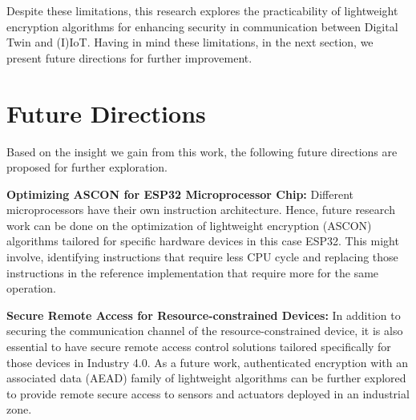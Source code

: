 Despite these limitations, this research explores the practicability of lightweight encryption algorithms for enhancing security in communication between Digital Twin and (I)IoT. Having in mind these limitations, in the next section, we present future directions for further improvement. 


\section{Future Directions}
Based on the insight we gain from this work, the following future directions are proposed for further exploration. 

\textbf{Optimizing ASCON for ESP32 Microprocessor Chip:}
Different microprocessors have their own instruction architecture. Hence, future research work can be done on the optimization of lightweight encryption (ASCON) algorithms tailored for specific hardware devices in this case ESP32. This might involve, identifying instructions that require less CPU cycle and replacing those instructions in the reference implementation that require more for the same operation. 

\textbf{Secure Remote Access for Resource-constrained Devices:} In addition to securing the communication channel of the resource-constrained device, it is also essential to have secure remote access control solutions tailored specifically for those devices in Industry 4.0. As a future work, authenticated encryption with an associated data (AEAD) family of lightweight algorithms can be further explored to provide remote secure access to sensors and actuators deployed in an industrial zone. 

